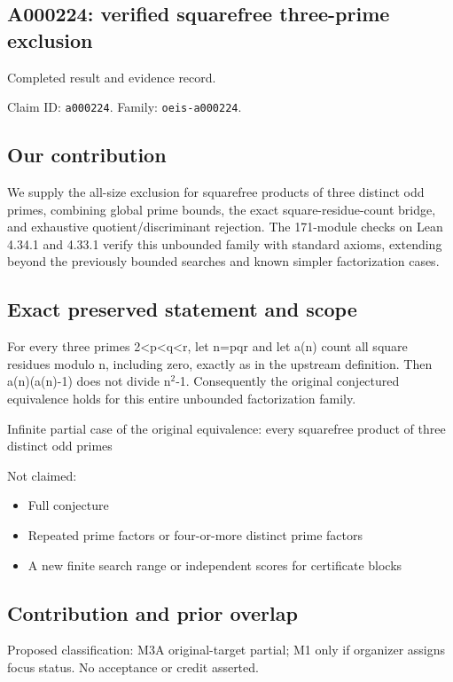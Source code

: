 \documentclass[11pt,a4paper]{article}
\begin{document}
\subsection{A000224: verified squarefree three-prime exclusion}
Completed result and evidence record.

Claim ID: \texttt{a000224}. Family: \texttt{oeis-a000224}.

\subsection{Our contribution}
We supply the all-size exclusion for squarefree products of three distinct odd primes, combining global prime bounds, the exact square-residue-count bridge, and exhaustive quotient/discriminant rejection. The 171-module checks on Lean 4.34.1 and 4.33.1 verify this unbounded family with standard axioms, extending beyond the previously bounded searches and known simpler factorization cases.

\subsection{Exact preserved statement and scope}
For every three primes 2<p<q<r, let n=pqr and let a(n) count all square residues modulo n, including zero, exactly as in the upstream definition. Then a(n)(a(n)-1) does not divide n\ensuremath{^2}-1. Consequently the original conjectured equivalence holds for this entire unbounded factorization family.

Infinite partial case of the original equivalence: every squarefree product of three distinct odd primes

Not claimed:

\begin{itemize}
\item Full conjecture
\end{itemize}
\begin{itemize}
\item Repeated prime factors or four-or-more distinct prime factors
\end{itemize}
\begin{itemize}
\item A new finite search range or independent scores for certificate blocks
\end{itemize}
\subsection{Contribution and prior overlap}
Proposed classification: M3A original-target partial; M1 only if organizer assigns focus status. No acceptance or credit asserted.
\end{document}
